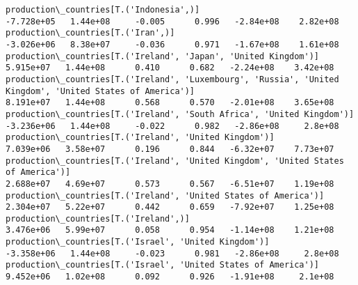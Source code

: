 \documentclass[11pt]{article}
\begin{document}
\begin{Verbatim}[commandchars=\\\{\}]
production\_countries[T.('Indonesia',)]                                                                                                                                                -7.728e+05   1.44e+08     -0.005      0.996   -2.84e+08    2.82e+08
production\_countries[T.('Iran',)]                                                                                                                                                     -3.026e+06   8.38e+07     -0.036      0.971   -1.67e+08    1.61e+08
production\_countries[T.('Ireland', 'Japan', 'United Kingdom')]                                                                                                                         5.915e+07   1.44e+08      0.410      0.682   -2.24e+08    3.42e+08
production\_countries[T.('Ireland', 'Luxembourg', 'Russia', 'United Kingdom', 'United States of America')]                                                                              8.191e+07   1.44e+08      0.568      0.570   -2.01e+08    3.65e+08
production\_countries[T.('Ireland', 'South Africa', 'United Kingdom')]                                                                                                                 -3.236e+06   1.44e+08     -0.022      0.982   -2.86e+08     2.8e+08
production\_countries[T.('Ireland', 'United Kingdom')]                                                                                                                                  7.039e+06   3.58e+07      0.196      0.844   -6.32e+07    7.73e+07
production\_countries[T.('Ireland', 'United Kingdom', 'United States of America')]                                                                                                      2.688e+07   4.69e+07      0.573      0.567   -6.51e+07    1.19e+08
production\_countries[T.('Ireland', 'United States of America')]                                                                                                                        2.304e+07   5.22e+07      0.442      0.659   -7.92e+07    1.25e+08
production\_countries[T.('Ireland',)]                                                                                                                                                   3.476e+06   5.99e+07      0.058      0.954   -1.14e+08    1.21e+08
production\_countries[T.('Israel', 'United Kingdom')]                                                                                                                                  -3.358e+06   1.44e+08     -0.023      0.981   -2.86e+08     2.8e+08
production\_countries[T.('Israel', 'United States of America')]                                                                                                                         9.452e+06   1.02e+08      0.092      0.926   -1.91e+08     2.1e+08

\end{Verbatim}
\end{document}
